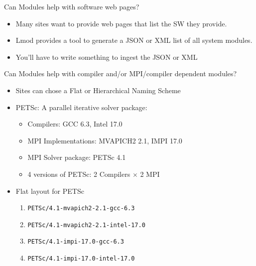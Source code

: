 \documentclass{beamer}
\begin{document}
\begin{frame}{Can Modules help with software web pages?}
  \begin{itemize}
    \item Many sites want to provide web pages that list the SW
      they provide.
    \item Lmod provides a tool to generate a JSON or XML list of all
      system modules.
    \item You'll have to write something to ingest the JSON or XML
  \end{itemize}
\end{frame}

\begin{frame}{Can Modules help with compiler and/or MPI/compiler
      dependent modules?}
  \begin{itemize}
    \item Sites can chose a Flat or Hierarchical Naming Scheme
    \item PETSc: A parallel iterative solver package:
      \begin{itemize}
        \item Compilers: GCC 6.3, Intel 17.0
        \item MPI Implementations: MVAPICH2 2.1, IMPI 17.0
        \item MPI Solver package: PETSc 4.1
        \item 4 versions of PETSc: 2 Compilers $\times$ 2 MPI
      \end{itemize}

    \item Flat layout for PETSc
      \begin{enumerate}
        \item \texttt{PETSc/4.1-mvapich2-2.1-gcc-6.3}
        \item \texttt{PETSc/4.1-mvapich2-2.1-intel-17.0}
        \item \texttt{PETSc/4.1-impi-17.0-gcc-6.3}
        \item \texttt{PETSc/4.1-impi-17.0-intel-17.0}
      \end{enumerate}
  \end{itemize}
\end{frame}
\end{document}
